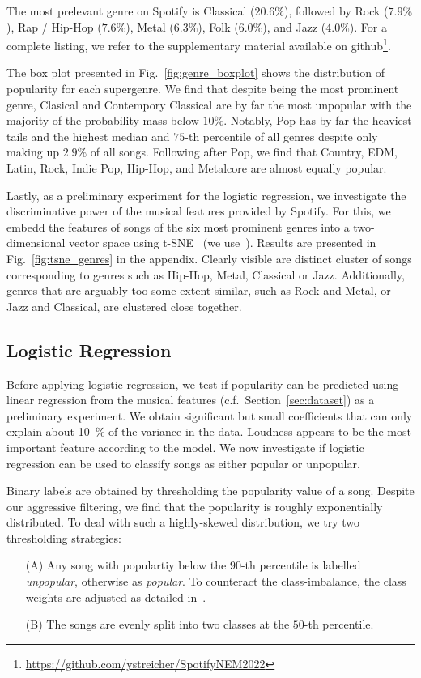 \documentclass{article}
\begin{document}
The most prelevant genre on Spotify is Classical ($20.6\%$), followed by Rock ($7.9\%$), Rap / Hip-Hop ($7.6\%$), Metal ($6.3\%$), Folk ($6.0\%$), and Jazz ($4.0\%$). For a complete listing, we refer to the supplementary material available on github\footnote{\url{https://github.com/ystreicher/SpotifyNEM2022}}.

The box plot presented in Fig.~\ref{fig:genre_boxplot} shows the distribution of popularity for each supergenre. We find that despite  being the most prominent genre, Clasical and Contempory Classical are by far the most unpopular with the majority of the probability mass below $10\%$. Notably, Pop has by far the heaviest tails and the highest median and $75$-th percentile of all genres despite only making up $2.9\%$ of all songs. Following after Pop, we find that Country, EDM, Latin, Rock, Indie Pop, Hip-Hop, and Metalcore are almost equally popular.

Lastly, as a preliminary experiment for the logistic regression, we investigate the discriminative power of the musical features provided by Spotify. For this, we embedd the features of songs of the six most prominent genres into a two-dimensional vector space using t-SNE~\cite{van2008visualizing} (we use~\cite{Policar731877}). Results are presented in Fig.~\ref{fig:tsne_genres} in the appendix. Clearly visible are distinct cluster of songs corresponding to genres such as Hip-Hop, Metal, Classical or Jazz. Additionally, genres that are arguably too some extent similar, such as Rock and Metal, or Jazz and Classical, are clustered close together.

\subsection{Logistic Regression}
Before applying logistic regression, we test if popularity can be predicted using linear regression from the musical features (c.f.~Section~\ref{sec:dataset}) as a preliminary experiment. We obtain significant but small coefficients that can only explain about \SI{10}{\percent} of the variance in the data. Loudness appears to be the most important feature according to the model. We now investigate if logistic regression can be used to classify songs as either popular or unpopular. 

Binary labels are obtained by thresholding the popularity value of a song. Despite our aggressive filtering, we find that the popularity is roughly exponentially distributed. To deal with such a highly-skewed distribution, we try two thresholding strategies:
\begin{enumerate}
  \item[(A)] Any song with populartiy below the $90$-th percentile is labelled \emph{unpopular}, otherwise as \emph{popular}. To counteract the class-imbalance, the class weights are adjusted as detailed in~\cite{haixiangLearningClassimbalancedData2017a}.
  \item[(B)] The songs are evenly split into two classes at the $50$-th percentile.
\end{enumerate}
\end{document}
